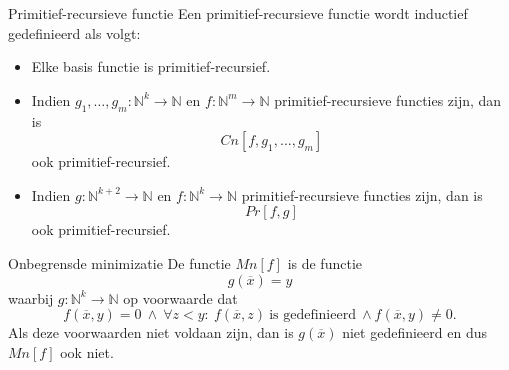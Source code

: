 \begin{theo}{Primitief-recursieve functie}
    Een primitief-recursieve functie wordt inductief gedefinieerd als volgt:
    \begin{itemize}
        \item 
            Elke basis functie is primitief-recursief.
        \item 
            Indien $g_1, \ldots, g_m: \mathbb{N}^k \to \mathbb{N}$ en $f: \mathbb{N}^m \to \mathbb{N}$ primitief-recursieve functies zijn, dan is 
            \begin{equation*}
                Cn[f, g_1, \ldots, g_m]
            \end{equation*} 
            ook primitief-recursief. 
        \item 
            Indien $g: \mathbb{N}^{k+2} \to \mathbb{N}$ en $f: \mathbb{N}^{k} \to \mathbb{N}$ primitief-recursieve functies zijn, dan is 
            \begin{equation*}
                Pr[f,g]
            \end{equation*}
            ook primitief-recursief. 
    \end{itemize}
\end{theo}

\begin{theo}{Onbegrensde minimizatie}
    De functie $Mn[f]$ is de functie
    \begin{equation*}
            g(\overline{x}) = y 
    \end{equation*}
    waarbij $g: \mathbb{N}^{k} \to \mathbb{N}$ op voorwaarde dat 
    \begin{equation*}
        f(\overline{x},y) = 0 \ \land \ \forall z < y: \ f(\overline{x}, z) \ \text{is gedefinieerd} \ \land f(\overline{x}, y) \neq 0. 
    \end{equation*}
    Als deze voorwaarden niet voldaan zijn, dan is $g(\overline{x})$ niet gedefinieerd en dus $Mn[f]$ ook niet.
\end{theo}

